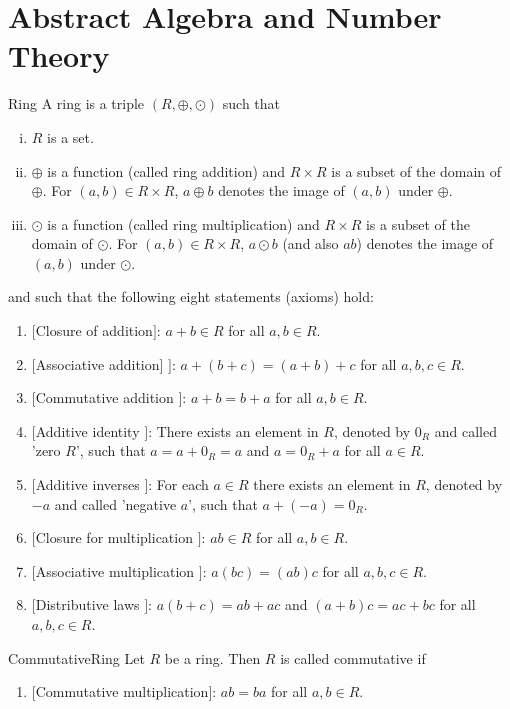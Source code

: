 \chapter{Abstract Algebra and Number Theory}
\thispagestyle{fancy}
\begin{defn}[Ring]{Ring}
	A ring is a triple $(R,\oplus, \odot)$ such that
	\begin{enumerate}[(i)]
		\item $R$ is a set.
		\item $\oplus$ is a function (called ring addition) and $R\times R$ is a subset of the domain of $\oplus$. For $(a, b) \in
		R \times R$, $a \oplus b$ denotes the image of $(a, b)$ under $\oplus$.
		\item $\odot$ is a function (called ring multiplication) and $R \times R$ is a subset of the domain of $\odot$. For
		$(a, b) \in R \times R$, $a \odot b$ (and also $ab$) denotes the image of $(a, b)$ under $\odot$.
	\end{enumerate} 
	and such that the following eight statements (axioms) hold:
	\begin{enumerate}[(1)]
		\item $[$Closure of addition$]$: $a + b \in R$ for all $a, b \in R$.
		\item $[$Associative addition] $]$: $a+(b+c)=(a+b)+c$ for all $a,b,c \in R$. 
		\item $[$Commutative addition $]$: $a+b = b+a$ for all $a,b \in R$.
		\item $[$Additive identity $]$: There exists an element in 
		$R$, denoted by $0_R$ and called 'zero $R$',
		such that $a = a + 0_R = a$ and $a = 0_R + a$ for all $a \in R$.
		\item $[$Additive inverses $]$: For each $a \in R$ there exists an element in $R$, denoted by $-a$ and called 'negative $a$', such that $a+(-a)=0_R$.
		\item $[$Closure for multiplication $]$: $ab \in R$ for all $a,b \in R$.
		\item $[$Associative multiplication $]$: $a(bc)=(ab)c$ for all $a,b,c \in R$.
		\item $[$Distributive laws $]$: $a(b+c)=ab+ac$ and $(a+b)c = ac+bc$ for all $a,b,c \in R$.
	\end{enumerate}
\end{defn}
\begin{defn}{CommutativeRing}
	Let $R$ be a ring. Then $R$ is called commutative if
	\begin{enumerate}[(9)]
		\item $[$Commutative multiplication$]$: $ab=ba$ for all $a,b \in R$.
	\end{enumerate}
\end{defn}
